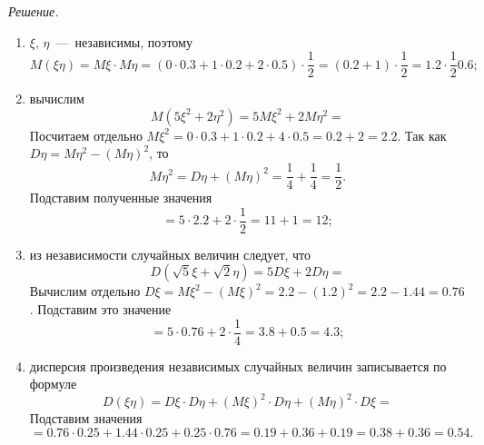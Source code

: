 \textit{Решение.}
\begin{enumerate}[label=\alph*)]
  \item $ \xi, \, \eta $~---~независимы, поэтому
  \begin{equation*}
    M \left( \xi \eta \right) =
    M \xi \cdot M \eta =
    \left( 0 \cdot 0.3 + 1 \cdot 0.2 + 2 \cdot 0.5 \right) \cdot \frac{1}{2} =
    \left( 0.2 + 1 \right) \cdot \frac{1}{2} =
    1.2 \cdot \frac{1}{2}
    0.6;
  \end{equation*}
  \item вычислим
  \begin{equation*}
    M \left( 5 \xi^2 + 2 \eta^2 \right) =
    5M \xi^2 + 2M \eta^2 =
  \end{equation*}
  Посчитаем отдельно
  $M \xi^2 =
   0 \cdot 0.3 + 1 \cdot 0.2 + 4 \cdot 0.5 =
   0.2 + 2 =
   2.2$.
  Так как $D \eta = M \eta^2 - \left( M \eta \right)^2$, то
  \begin{equation*}
    M \eta^2 =
    D \eta + \left( M \eta \right)^2 =
    \frac{1}{4} + \frac{1}{4} =
    \frac{1}{2}.
  \end{equation*}
  Подставим полученные значения
  \begin{equation*}
    = 5 \cdot 2.2 + 2 \cdot \frac{1}{2} =
    11 + 1 =
    12;
  \end{equation*}
  \item из независимости случайных величин следует, что
  \begin{equation*}
    D \left( \sqrt{5} \xi + \sqrt{2} \eta \right) =
    5D \xi + 2D \eta =
  \end{equation*}
  Вычислим отдельно
  $D \xi =
   M \xi^2 - \left( M \xi \right)^2 =
   2.2 - \left( 1.2 \right)^2 =
   2.2 - 1.44 =
   0.76$.
  Подставим это значение
  \begin{equation*}
    = 5 \cdot 0.76 + 2 \cdot \frac{1}{4} =
    3.8 + 0.5 =
    4.3;
  \end{equation*}
  \item дисперсия произведения независимых случайных величин записывается по
  формуле
  \begin{equation*}
    D \left( \xi \eta \right) =
    D \xi \cdot D \eta + \left( M \xi \right)^2 \cdot D \eta +
    \left( M \eta \right)^2 \cdot D \xi =
  \end{equation*}
  Подставим значения
  \begin{equation*}
    = 0.76 \cdot 0.25 + 1.44 \cdot 0.25 + 0.25 \cdot 0.76 =
    0.19 + 0.36 + 0.19 =
    0.38 + 0.36 =
    0.54.
  \end{equation*}
\end{enumerate}

